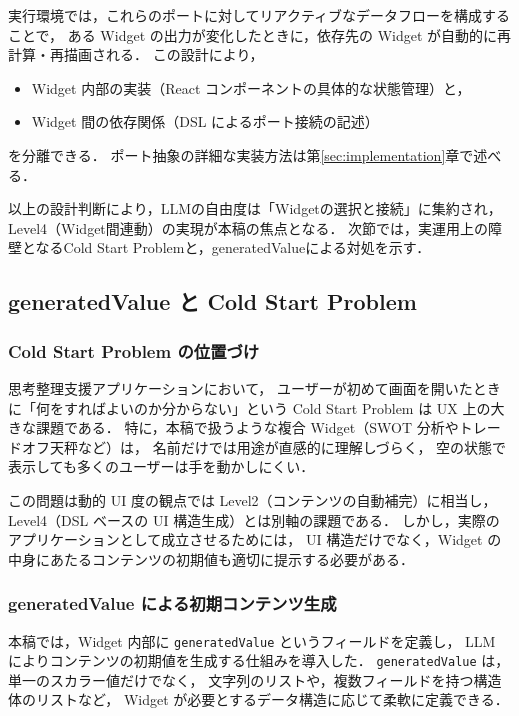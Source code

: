 \documentclass[a4paper,10pt]{jarticle}
\begin{document}
実行環境では，これらのポートに対してリアクティブなデータフローを構成することで，
ある Widget の出力が変化したときに，依存先の Widget が自動的に再計算・再描画される．
この設計により，
\begin{itemize}
  \item Widget 内部の実装（React コンポーネントの具体的な状態管理）と，
  \item Widget 間の依存関係（DSL によるポート接続の記述）
\end{itemize}
を分離できる．
ポート抽象の詳細な実装方法は第\ref{sec:implementation}章で述べる．

以上の設計判断により，LLMの自由度は「Widgetの選択と接続」に集約され， Level4（Widget間連動）の実現が本稿の焦点となる． 次節では，実運用上の障壁となるCold Start Problemと，generatedValueによる対処を示す．

\subsection{generatedValue と Cold Start Problem}

\subsubsection{Cold Start Problem の位置づけ}

思考整理支援アプリケーションにおいて，
ユーザーが初めて画面を開いたときに「何をすればよいのか分からない」という
Cold Start Problem は UX 上の大きな課題である．
特に，本稿で扱うような複合 Widget（SWOT 分析やトレードオフ天秤など）は，
名前だけでは用途が直感的に理解しづらく，
空の状態で表示しても多くのユーザーは手を動かしにくい．

この問題は動的 UI 度の観点では Level2（コンテンツの自動補完）に相当し，
Level4（DSL ベースの UI 構造生成）とは別軸の課題である．
しかし，実際のアプリケーションとして成立させるためには，
UI 構造だけでなく，Widget の中身にあたるコンテンツの初期値も適切に提示する必要がある．

\subsubsection{generatedValue による初期コンテンツ生成}

本稿では，Widget 内部に \texttt{generatedValue} というフィールドを定義し，
LLM によりコンテンツの初期値を生成する仕組みを導入した．
\texttt{generatedValue} は，単一のスカラー値だけでなく，
文字列のリストや，複数フィールドを持つ構造体のリストなど，
Widget が必要とするデータ構造に応じて柔軟に定義できる．
\end{document}
